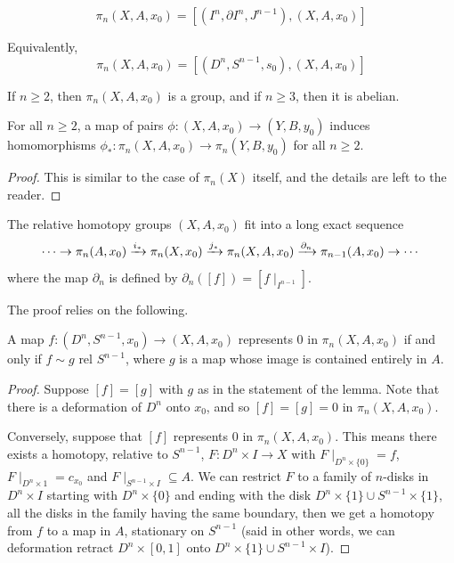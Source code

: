 \documentclass[ma3408.tex]{subfiles}
\begin{document}
\begin{Def}
	\[
\pi_n(X,A,x_0) = [(I^n,\partial I^n,J^{n-1}),(X,A,x_0)]
	\]
\end{Def}
\begin{Rem}
	Equivalently, 
	\[
\pi_n(X,A,x_0) = [(D^n,S^{n-1},s_0),(X,A,x_0)]
	\]
\end{Rem}
\begin{Prop}
	If $n \ge 2$, then $\pi_n(X,A,x_0)$ is a group, and if $n \ge 3$, then it is abelian. 

	For all $n \ge 2$, a map of pairs $\phi \colon (X,A,x_0) \to (Y,B,y_0)$ induces homomorphisms $\phi_* \colon \pi_n(X,A,x_0) \to \pi_n(Y,B,y_0)$ for all $n \ge 2$. 
\end{Prop}
\begin{proof}
This is similar to the case of $\pi_n(X)$ itself, and the details are left to the reader. 
\end{proof}
\begin{Thm}\label{thm:les_rel}
	The relative homotopy groups $(X,A,x_0)$ fit into a long exact sequence 
	\[
\cdots \to \pi_n(A,x_0) \xrightarrow{i_*} \pi_n(X,x_0) \xrightarrow{j_*} \pi_n(X,A,x_0) \xrightarrow{\partial_n} \pi_{n-1}(A,x_0) \to \cdots
	\]
	where the map $\partial_n$ is defined by $\partial_n([f]) = [f\mid_{I^{n-1}}]$. 
\end{Thm}
The proof relies on the following.
\begin{Lem}
	A map $f \colon (D^n,S^{n-1},x_0) \to (X,A,x_0)$ represents 0 in $\pi_n(X,A,x_0)$ if and only if $f \sim g \text{ rel } S^{n-1}$, where $g$ is a map whose image is contained entirely in $A$. 
\end{Lem}
\begin{proof}
	Suppose $[f] = [g]$ with $g$ as in the statement of the lemma. Note that there is a deformation of $D^n$ onto $x_0$, and so $[f] = [g] = 0$ in $\pi_n(X,A,x_0)$. 

	Conversely, suppose that $[f]$ represents 0 in $\pi_n(X,A,x_0)$. This means there exists a homotopy, relative to $S^{n-1}$, $F \colon D^n \times I \to X$ with $F \mid_{D^n \times \{0 \}} = f$, $F \mid_{D^n \times 1} = c_{x_0}$ and $F \mid_{S^{n-1} \times I} \subseteq A$. We can restrict $F$ to a family of $n$-disks in $D^n \times I$ starting with $D^n \times \{ 0 \}$ and ending with the disk $D^n \times \{1 \} \cup S^{n-1} \times \{ 1\}$, all the disks in the family having the same boundary, then we get a homotopy from $f$ to a map in $A$, stationary on $S^{n-1}$ (said in other words, we can deformation retract $D^n \times [0,1]$ onto $D^n \times \{1 \} \cup S^{n-1} \times I$). 
\end{proof}
\end{document}
